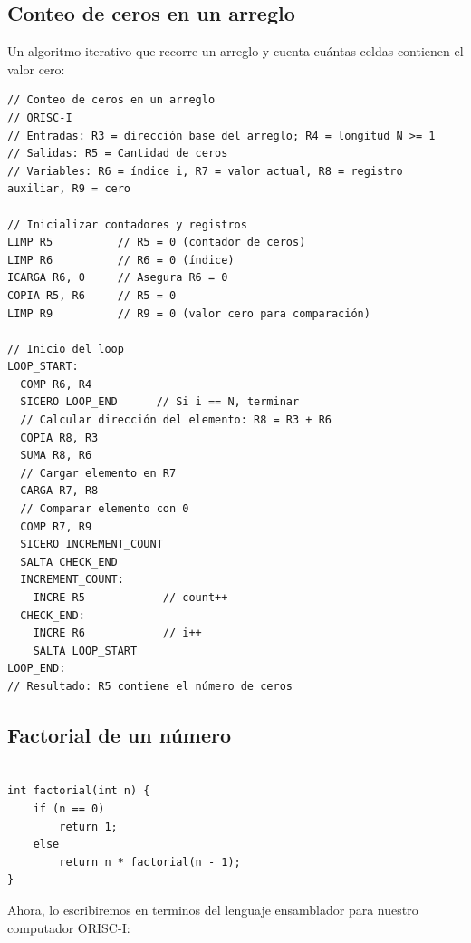 \documentclass{article}
\begin{document}
\subsection{Conteo de ceros en un arreglo}

Un algoritmo iterativo que recorre un arreglo y cuenta cuántas celdas contienen el valor cero:

\begin{verbatim}
// Conteo de ceros en un arreglo
// ORISC-I
// Entradas: R3 = dirección base del arreglo; R4 = longitud N >= 1
// Salidas: R5 = Cantidad de ceros
// Variables: R6 = índice i, R7 = valor actual, R8 = registro auxiliar, R9 = cero

// Inicializar contadores y registros
LIMP R5          // R5 = 0 (contador de ceros)
LIMP R6          // R6 = 0 (índice)
ICARGA R6, 0     // Asegura R6 = 0
COPIA R5, R6     // R5 = 0
LIMP R9          // R9 = 0 (valor cero para comparación)

// Inicio del loop
LOOP_START:
  COMP R6, R4
  SICERO LOOP_END      // Si i == N, terminar
  // Calcular dirección del elemento: R8 = R3 + R6
  COPIA R8, R3
  SUMA R8, R6
  // Cargar elemento en R7
  CARGA R7, R8
  // Comparar elemento con 0
  COMP R7, R9
  SICERO INCREMENT_COUNT
  SALTA CHECK_END
  INCREMENT_COUNT:
    INCRE R5            // count++
  CHECK_END:
    INCRE R6            // i++
    SALTA LOOP_START
LOOP_END:
// Resultado: R5 contiene el número de ceros
\end{verbatim}


\subsection{Factorial de un número}


\begin{verbatim}

int factorial(int n) {
    if (n == 0)
        return 1;
    else
        return n * factorial(n - 1);
}
\end{verbatim}
Ahora, lo escribiremos en terminos del lenguaje ensamblador para nuestro computador ORISC-I:
\end{document}
